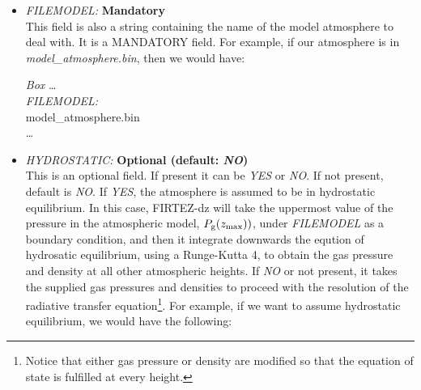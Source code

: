 \begin{itemize}
  \item {\it FILEMODEL:} {\bf Mandatory}\\
  
  This field is also a string containing the name of the model atmosphere to deal with. It is a MANDATORY field. For example, if our atmosphere is in {\it model\_atmosphere.bin}, then we would have:\\

\begin{ifbox}[label={tb:box}]{{\it Box}}
  \scriptsize
  \ldots\\
  {\it FILEMODEL:}\\
  model\_atmosphere.bin\\
  \ldots
  \normalsize
\end{ifbox}
  

  \item {\it HYDROSTATIC:} {\bf Optional (default: {\it NO})}\\
  
  This is an optional field. If present it can be {\it YES} or {\it NO}. If not present, default is {\it NO}. If {\it YES}, the atmosphere is assumed to be in hydrostatic equilibrium. In this case, FIRTEZ-dz will take the uppermost value of the pressure in the atmospheric model, $P_{\rm g}(z_{\rm max}))$, under {\it FILEMODEL} as a boundary condition, and then it integrate downwards the eqution of hydrosatic equilibrium, using a Runge-Kutta 4, to obtain the gas pressure and density at all other atmospheric heights. If {\it NO} or not present, it takes the supplied gas pressures and densities to proceed with the resolution of the radiative transfer equation\footnote{Notice that either gas pressure or density are modified so that the equation of state is fulfilled at every height.}. For example, if we want to assume hydrostatic equilibrium, we would have the following:\\


\end{itemize}
